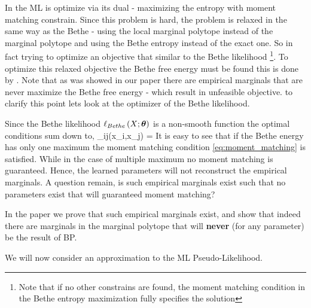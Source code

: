In \cite{ganapathi2012constrained} the ML is optimize via its dual - maximizing the entropy with moment matching constrain.
Since this problem is hard, the problem is relaxed in the same way as the Bethe - using the local marginal polytope  instead of the marginal polytope and using the Bethe entropy instead of the exact one.
So in fact trying to optimize an objective that similar to the Bethe likelihood \footnote{Note that if no other constrains are found, the moment matching condition in the Bethe entropy maximization fully specifies the solution}.
To optimize this relaxed objective the Bethe free energy must be found this is done by \cite{yuille2002cccp}.
Note that as was showed in our paper \cite{heinemann2012cannot} there are empirical marginals that are never  maximize the Bethe free energy - which result in unfeasible objective.
to clarify this point lets look at the optimizer of the Bethe likelihood.


Since the Bethe likelihood $\ell_{Bethe}\left(X;\boldsymbol{\theta}\right)$ is a non-smooth function the optimal conditions sum down to,
\be
\mu_{ij}(x_i,x_j) = 
\ee
It is easy to see that if the Bethe energy has only one maximum the moment matching condition \eqref{eq:moment_matching} is satisfied.
While in the case of multiple maximum no moment matching is guaranteed.
Hence, the learned parameters will not reconstruct the empirical marginals.
A question remain, is such empirical marginals exist such that no parameters exist that will guaranteed moment matching?

In the paper \cite{heinemann2012cannot} we prove that such empirical marginals exist, and show that indeed there are marginals in the marginal polytope that will \textbf{never} (for any parameter) be the result of BP.

We will now consider an approximation to the ML Pseudo-Likelihood.
